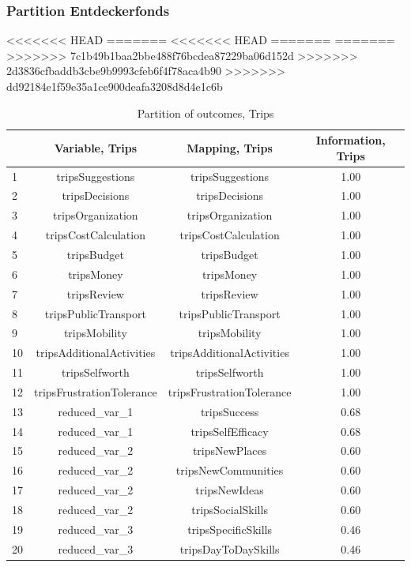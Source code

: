 \begin{frame}[fragile]
\begin{frame}[fragile]
\begin{frame}
\frametitle{Partition Entdeckerfonds}
<<<<<<< HEAD
=======
<<<<<<< HEAD
=======
=======
>>>>>>> 7c1b49b1baa2bbe488f76bcdea87229ba06d152d
>>>>>>> 2d3836cfbaddb3cbe9b9993cfeb6f4f78aca4b90
>>>>>>> dd92184e1f59e35a1ce900deafa3208d8d4e1c6b
\begin{table}[ht]
\centering
\begin{tabular}{lccc}
  \hline
 & Variable, Trips & Mapping, Trips & Information, Trips \\ 
  \hline
1 & tripsSuggestions & tripsSuggestions & 1.00 \\ 
  2 & tripsDecisions & tripsDecisions & 1.00 \\ 
  3 & tripsOrganization & tripsOrganization & 1.00 \\ 
  4 & tripsCostCalculation & tripsCostCalculation & 1.00 \\ 
  5 & tripsBudget & tripsBudget & 1.00 \\ 
  6 & tripsMoney & tripsMoney & 1.00 \\ 
  7 & tripsReview & tripsReview & 1.00 \\ 
  8 & tripsPublicTransport & tripsPublicTransport & 1.00 \\ 
  9 & tripsMobility & tripsMobility & 1.00 \\ 
  10 & tripsAdditionalActivities & tripsAdditionalActivities & 1.00 \\ 
  11 & tripsSelfworth & tripsSelfworth & 1.00 \\ 
  12 & tripsFrustrationTolerance & tripsFrustrationTolerance & 1.00 \\ 
  13 & reduced\_var\_1 & tripsSuccess & 0.68 \\ 
  14 & reduced\_var\_1 & tripsSelfEfficacy & 0.68 \\ 
  15 & reduced\_var\_2 & tripsNewPlaces & 0.60 \\ 
  16 & reduced\_var\_2 & tripsNewCommunities & 0.60 \\ 
  17 & reduced\_var\_2 & tripsNewIdeas & 0.60 \\ 
  18 & reduced\_var\_2 & tripsSocialSkills & 0.60 \\ 
  19 & reduced\_var\_3 & tripsSpecificSkills & 0.46 \\ 
  20 & reduced\_var\_3 & tripsDayToDaySkills & 0.46 \\ 
   \hline
\end{tabular}
\caption{Partition of outcomes, Trips} 
\label{partitiontrips}
\end{table}


\end{frame}
\end{frame}
\end{frame}
